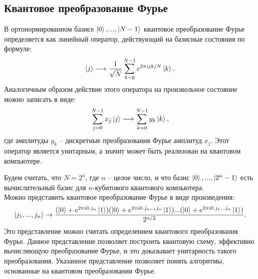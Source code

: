 \documentclass[12pt,a4paper]{article}
\begin{document}
	\subsection{Квантовое преобразование Фурье}
	В ортонормированном базисе $\ket{0},...,\ket{N-1}$ квантовое преобразование Фурье определяется как линейный оператор, действующий на базисные состояния по формуле\cite{1}: \\
	\begin{equation}\label{eq_4}
		\ket{j}\longrightarrow\frac{1}{\sqrt{N}}\sum_{k=0}^{N-1}e^{2\pi ijk/N}\ket{k}.
	\end{equation}
	Аналогичным образом действие этого оператора на произвольное состояние можно записать в виде:\\
	\begin{equation}\label{eq_5}
		\sum_{j=0}^{N-1}x_{j}\ket{j}\longrightarrow\sum_{k=0}^{N-1}y_{k}\ket{k},
	\end{equation}
	где амплитуды $y_{k}$ -- дискретные преобразования Фурье амплитуд $x_{j}$. Этот оператор является унитарным, а значит может быть реализован на квантовом компьютере.\par
	 Будем считать, что $N=2^{n}$, где $n$ -- целое число, и что базис $\ket{0},...,\ket{2^{n}-1}$ есть вычислительный базис для $n$-кубитового квантового компьютера.\\
	Можно представить квантовое преобразование Фурье в виде произведения:\\
	\begin{equation}\label{eq_6}
		\ket{j_{1},...,j_{n}}\rightarrow\frac{(\ket{0}+e^{2\pi i0.j_{n}}\ket{1})(\ket{0}+e^{2\pi i0.j_{n-1}j_{n}}\ket{1})...(\ket{0}+e^{2\pi i0.j_{1}...j_{n}}\ket{1})}{2^{n/2}}.
	\end{equation}
	Это представление можно считать определением квантового преобразования Фурье. Данное представление
	позволяет построить квантовую схему, эффективно вычисляющую преобразование Фурье, и это доказывает унитарность такого преобразования. Указанное представление позволяет понять алгоритмы, основанные на квантовом преобразовании Фурье. \\
	
\end{document}
